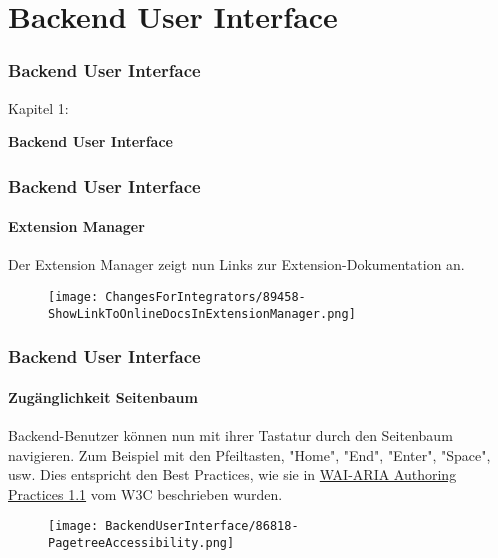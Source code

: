 %

\section{Backend User Interface}
\begin{frame}[fragile]
	\frametitle{Backend User Interface}

	\begin{center}\huge{Kapitel 1:}\end{center}
	\begin{center}\huge{\color{typo3darkgrey}\textbf{Backend User Interface}}\end{center}

\end{frame}


\begin{frame}[fragile]
	\frametitle{Backend User Interface}
	\framesubtitle{Extension Manager}

	Der Extension Manager zeigt nun Links zur Extension-Dokumentation an.

	\begin{figure}
		\texttt{[image: ChangesForIntegrators/89458-ShowLinkToOnlineDocsInExtensionManager.png]}
	\end{figure}

\end{frame}


\begin{frame}[fragile]
	\frametitle{Backend User Interface}
	\framesubtitle{Zugänglichkeit Seitenbaum}

	Backend-Benutzer können nun mit ihrer Tastatur durch den Seitenbaum navigieren.
	Zum Beispiel mit den Pfeiltasten, "Home", "End", "Enter", "Space", usw.
	\newline
	Dies entspricht den Best Practices, wie sie in
	\href{https://www.w3.org/TR/wai-aria-practices-1.1/#keyboard-interaction-22}{WAI-ARIA Authoring Practices 1.1}
	vom W3C beschrieben wurden.

	\begin{figure}
		\texttt{[image: BackendUserInterface/86818-PagetreeAccessibility.png]}
	\end{figure}

\end{frame}


